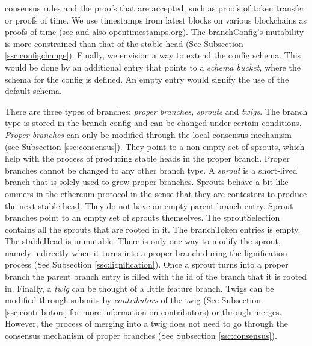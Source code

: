 \documentclass[14pt]{article}
\begin{document}
consensus rules and the proofs that are accepted, such as proofs of token transfer or proofs of time. We use timestamps from latest blocks on various blockchains as proofs of time (see \cite{gipp2015decentralized} and also  \href{https://opentimestamps.org/}{opentimestamps.org}). The branchConfig's mutability is more constrained than that of the stable head (See Subsection \ref{ssc:configchange}).
Finally, we envision a way to extend the config schema. This would be done by an additional entry that points to a \textit{schema bucket}, where the schema for the config is defined. An empty entry would signify the use of the default schema.


There are three types of branches: \textit{proper branches}, \textit{sprouts} and \textit{twigs}. The branch type is stored in the branch config and can be changed under certain conditions. 
\textit{Proper branches} can only be modified through the local consensus mechanism (see Subsection \ref{ssc:consensus}). They point to a non-empty set of sprouts, which help with the process of producing stable heads in the proper branch. Proper branches cannot be changed to any other branch type. A \textit{sprout} is a short-lived branch that is solely used to grow proper branches. Sprouts behave a bit like ommers in the ethereum protocol in the sense that they are contestors to produce the next stable head. They do not have an empty parent branch entry. Sprout branches point to an empty set of sprouts themselves. The sproutSelection contains all the sprouts that are rooted in it. The branchToken entries is empty. The stableHead is immutable. There is only one way to modify the sprout, namely indirectly when it turns into a proper branch during the lignification process (See Subsection \ref{ssc:lignification}). Once a sprout turns into a proper branch the parent branch entry is filled with the id of the branch that it is rooted in. Finally, a \textit{twig} can be thought of a little feature branch. Twigs can be modified through submits by \textit{contributors} of the twig (See Subsection \ref{ssc:contributors} for more information on contributors) or through merges. However, the process of merging into a twig does not need to go through the consensus mechanism of proper branches (See Subsection \ref{ssc:consensus}).
\end{document}
